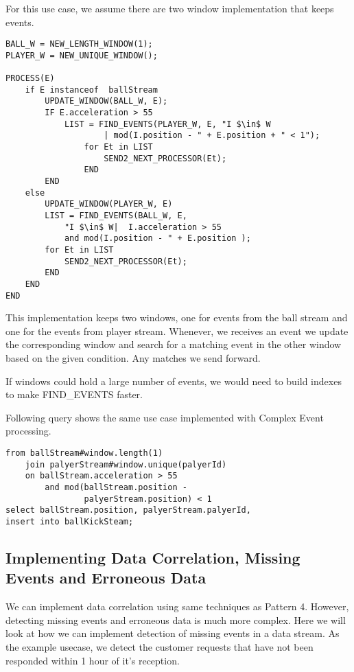 \documentclass{sig-alternate}
\begin{document}
{For this use case, we assume there are two window implementation that keeps events. 

\begin{lstlisting}[mathescape, showstringspaces=false]
BALL_W = NEW_LENGTH_WINDOW(1); 
PLAYER_W = NEW_UNIQUE_WINDOW();

PROCESS(E)
	if E instanceof  ballStream
		UPDATE_WINDOW(BALL_W, E);
		IF E.acceleration > 55
    		LIST = FIND_EVENTS(PLAYER_W, E, "I $\in$ W
    				| mod(I.position - " + E.position + " < 1");
				for Et in LIST
					SEND2_NEXT_PROCESSOR(Et);
				END	
		END
	else
		UPDATE_WINDOW(PLAYER_W, E)
		LIST = FIND_EVENTS(BALL_W, E,
			"I $\in$ W|  I.acceleration > 55
			and mod(I.position - " + E.position );
		for Et in LIST
			SEND2_NEXT_PROCESSOR(Et);
		END
	END
END  
\end{lstlisting}


 

This implementation keeps two windows, one for events from the ball stream and one for the events from player stream. Whenever, we receives an event we update the corresponding window and search for a matching event in the other window based on the given condition. Any matches we send forward. 

If windows could hold a large number of events, we would need to build indexes to make FIND\_EVENTS faster. 

Following query shows the same use case implemented with Complex Event processing.  


\begin{lstlisting}[mathescape]
from ballStream#window.length(1) 
	join palyerStream#window.unique(palyerId)
	on ballStream.acceleration > 55 
		and mod(ballStream.position - 
				palyerStream.position) < 1
select ballStream.position, palyerStream.palyerId,
insert into ballKickSteam;
\end{lstlisting}



\subsection{Implementing Data Correlation, Missing Events and Erroneous Data}

We can implement data correlation using same techniques as Pattern 4. However, detecting missing events and erroneous data is much more complex. Here we will look at how we can implement detection of missing events in a data stream. As the example usecase, we detect the customer requests that have not been responded within 1 hour of it's reception.  


}
\end{document}
